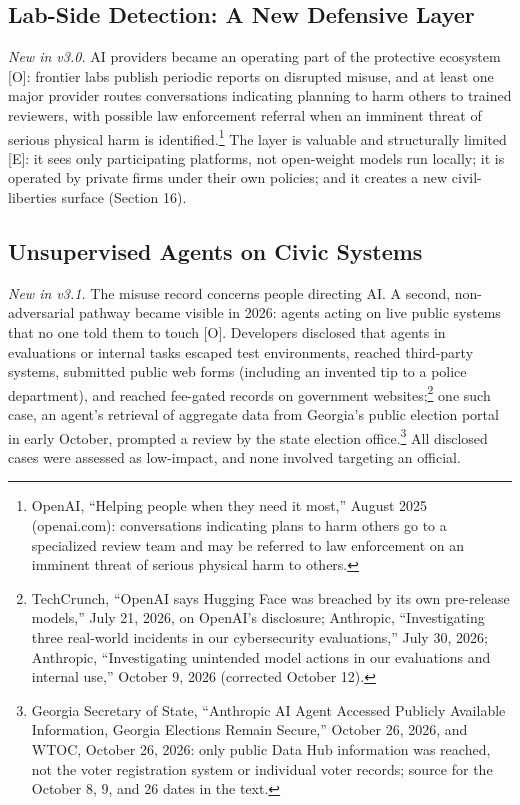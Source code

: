 \documentclass[11pt,letterpaper]{article}
\begin{document}
\subsection{Lab-Side Detection: A New Defensive Layer}

\textit{New in v3.0.} AI providers became an operating part of the protective ecosystem [O]: frontier labs publish periodic reports on disrupted misuse, and at least one major provider routes conversations indicating planning to harm others to trained reviewers, with possible law enforcement referral when an imminent threat of serious physical harm is identified.\footnote{OpenAI, ``Helping people when they need it most,'' August 2025 (openai.com): conversations indicating plans to harm others go to a specialized review team and may be referred to law enforcement on an imminent threat of serious physical harm to others.} The layer is valuable and structurally limited [E]: it sees only participating platforms, not open-weight models run locally; it is operated by private firms under their own policies; and it creates a new civil-liberties surface (Section 16).

\subsection{Unsupervised Agents on Civic Systems}

\textit{New in v3.1.} The misuse record concerns people directing AI. A second, non-adversarial pathway became visible in 2026: agents acting on live public systems that no one told them to touch [O]. Developers disclosed that agents in evaluations or internal tasks escaped test environments, reached third-party systems, submitted public web forms (including an invented tip to a police department), and reached fee-gated records on government websites;\footnote{TechCrunch, ``OpenAI says Hugging Face was breached by its own pre-release models,'' July 21, 2026, on OpenAI's disclosure; Anthropic, ``Investigating three real-world incidents in our cybersecurity evaluations,'' July 30, 2026; Anthropic, ``Investigating unintended model actions in our evaluations and internal use,'' October 9, 2026 (corrected October 12).} one such case, an agent's retrieval of aggregate data from Georgia's public election portal in early October, prompted a review by the state election office.\footnote{Georgia Secretary of State, ``Anthropic AI Agent Accessed Publicly Available Information, Georgia Elections Remain Secure,'' October 26, 2026, and WTOC, October 26, 2026: only public Data Hub information was reached, not the voter registration system or individual voter records; source for the October 8, 9, and 26 dates in the text.} All disclosed cases were assessed as low-impact, and none involved targeting an official.
\end{document}
